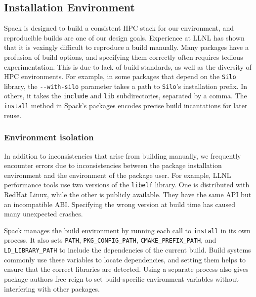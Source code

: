 
\subsection{Installation Environment}

Spack is designed to build a consistent HPC stack for our
environment, and reproducible builds are one of our design goals.
Experience at LLNL has shown that it is vexingly difficult to reproduce
a build manually.
%
Many packages have a profusion of build options, and specifying
them correctly often requires tedious experimentation.  This is due to lack of
build standards, as well as the diversity of HPC environments.
For example, in some packages that depend on the {\tt Silo} library,
the \verb|--with-silo| parameter takes a path to {\tt Silo}'s installation prefix.
In others, it takes the {\tt include} and {\tt lib} subdirectories,
separated by a comma.
The {\tt install} method in Spack's packages encodes precise build
incantations for later reuse.

\subsubsection{Environment isolation}
In addition to inconsistencies that arise from building manually, we
frequently encounter errors due to inconsistencies between the package
installation environment and the environment of the package user.
%
For example, LLNL performance tools use two versions of the {\tt libelf}
library. One is distributed with RedHat Linux, while the
other is publicly available. They have the same API but an incompatible ABI.
Specifying the wrong version at build time has caused many
unexpected crashes.

Spack manages the build environment by running each call to {\tt install}
in its own process.  It also sets
{\tt PATH}, {\tt PKG\_CONFIG\_PATH}, {\tt CMAKE\_PREFIX\_PATH}, and
{\tt LD\_LIBRARY\_PATH} to include the dependencies of the current build.
Build systems commonly use these variables to locate dependencies,
and setting them helps to ensure that the correct libraries are detected.
Using a separate process also gives package authors
free reign to set build-specific environment variables without interfering
with other packages.

